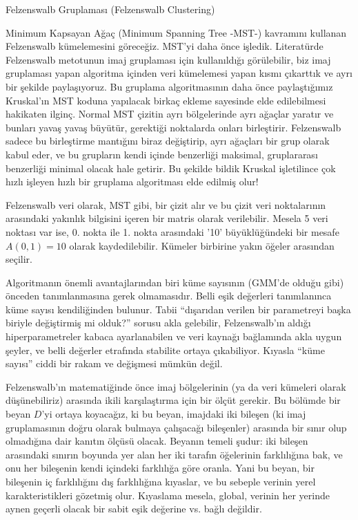 \documentclass[12pt,fleqn]{article}\usepackage{../../common}
\begin{document}
Felzenswalb Gruplaması (Felzenswalb Clustering)

Minimum Kapsayan Ağaç (Minimum Spanning Tree -MST-) kavramını kullanan
Felzenswalb kümelemesini göreceğiz. MST'yi daha önce işledik. Literatürde
Felzenswalb metotunun imaj gruplaması için kullanıldığı görülebilir, biz
imaj gruplaması yapan algoritma içinden veri kümelemesi yapan kısmı
çıkarttık ve ayrı bir şekilde paylaşıyoruz. Bu gruplama algoritmasının daha
önce paylaştığımız Kruskal'ın MST koduna yapılacak birkaç ekleme sayesinde
elde edilebilmesi hakikaten ilginç. Normal MST çizitin ayrı bölgelerinde
ayrı ağaçlar yaratır ve bunları yavaş yavaş büyütür, gerektiği noktalarda
onları birleştirir. Felzenswalb sadece bu birleştirme mantığını biraz
değiştirip, ayrı ağaçları bir grup olarak kabul eder, ve bu grupların kendi
içinde benzerliği maksimal, gruplararası benzerliği minimal olacak hale
getirir. Bu şekilde bildik Kruskal işletilince çok hızlı işleyen hızlı bir
gruplama algoritması elde edilmiş olur!

Felzenswalb veri olarak, MST gibi, bir çizit alır ve bu çizit veri
noktalarının arasındaki yakınlık bilgisini içeren bir matris olarak
verilebilir. Mesela 5 veri noktası var ise, 0. nokta ile 1. nokta
arasındaki '10' büyüklüğündeki bir mesafe $A(0,1) = 10$ olarak
kaydedilebilir. Kümeler birbirine yakın öğeler arasından seçilir.

Algoritmanın önemli avantajlarından biri küme sayısının (GMM'de olduğu
gibi) önceden tanımlanmasına gerek olmamasıdır. Belli eşik değerleri
tanımlanınca küme sayısı kendiliğinden bulunur. Tabii ``dışarıdan verilen
bir parametreyi başka biriyle değiştirmiş mi olduk?'' sorusu akla
gelebilir, Felzenswalb'ın aldığı hiperparametreler kabaca ayarlanabilen ve
veri kaynağı bağlamında akla uygun şeyler, ve belli değerler etrafında
stabilite ortaya çıkabiliyor. Kıyasla ``küme sayısı'' ciddi bir rakam ve
değişmesi mümkün değil. 

Felzenswalb'ın matematiğinde önce imaj bölgelerinin (ya da veri kümeleri
olarak düşünebiliriz) arasında ikili karşılaştırma için bir ölçüt
gerekir. Bu bölümde bir beyan $D$'yi ortaya koyacağız, ki bu beyan,
imajdaki iki bileşen (ki imaj gruplamasının doğru olarak bulmaya çalışacağı
bileşenler) arasında bir sınır olup olmadığına dair kanıtın ölçüsü
olacak. Beyanın temeli şudur: iki bileşen arasındaki sınırın boyunda yer
alan her iki tarafın öğelerinin farklılığına bak, ve onu her bileşenin
kendi içindeki farklılığa göre oranla. Yani bu beyan, bir bileşenin iç
farklılığını dış farklılığına kıyaslar, ve bu sebeple verinin yerel
karakteristikleri gözetmiş olur. Kıyaslama mesela, global, verinin her
yerinde aynen geçerli olacak bir sabit eşik değerine vs. bağlı değildir.
\end{document}
